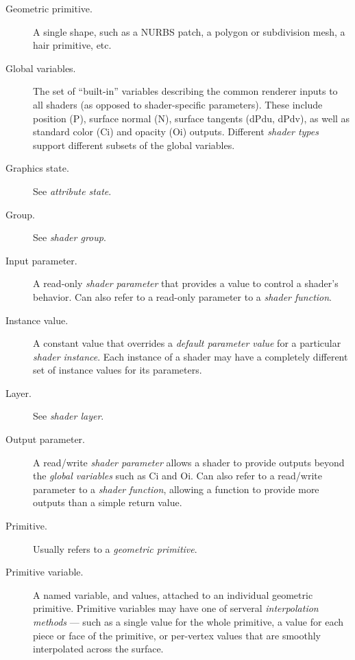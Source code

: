 \documentclass[11pt,letterpaper]{book}
\def\Ci{{\cf Ci}\xspace}
\def\Oi{{\cf Oi}\xspace}
\def\N{{\cf N}\xspace}
\def\P{{\cf P}\xspace}
\def\dPdu{{\cf dPdu}\xspace}
\def\dPdv{{\cf dPdv}\xspace}
\begin{document}
\begin{appendix}
\begin{description}
\item[Geometric primitive.] A single shape, such as a NURBS patch, a
  polygon or subdivision mesh, a hair primitive, etc.

\item[Global variables.] The set of ``built-in'' variables describing the
  common renderer inputs to all shaders (as opposed to shader-specific
  parameters).  These include position (\P), surface normal (\N),
  surface tangents (\dPdu, \dPdv), as well as standard color (\Ci) and
  opacity (\Oi) outputs.  Different \emph{shader types} support
  different subsets of the global variables.

\item[Graphics state.] See \emph{attribute state}.

\item[Group.] See \emph{shader group}.

\item[Input parameter.] A read-only \emph{shader parameter} that provides
  a value to control a shader's behavior.  Can also refer to a read-only
  parameter to a \emph{shader function}.

\item[Instance value.] A constant value that overrides a \emph{default
  parameter value} for a particular \emph{shader instance}.  Each
  instance of a shader may have a completely different set of instance
  values for its parameters.

\item[Layer.] See \emph{shader layer}.

\item[Output parameter.] A read/write \emph{shader parameter} allows a
  shader to provide outputs beyond the \emph{global variables} such as
  \Ci and \Oi.  Can also refer to a read/write parameter to a
  \emph{shader function}, allowing a function to provide more outputs
  than a simple return value.

\item[Primitive.] Usually refers to a \emph{geometric primitive}.

\item[Primitive variable.] A named variable, and values, attached to an
  individual geometric primitive.  Primitive variables may have one of
  serveral \emph{interpolation methods} --- such as a single value for
  the whole primitive, a value for each piece or face of the primitive,
  or per-vertex values that are smoothly interpolated across the
  surface.


\end{description}
\end{appendix}
\end{document}
